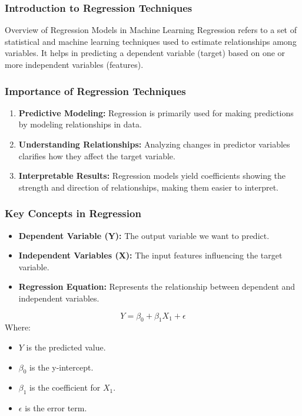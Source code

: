 \documentclass[aspectratio=169]{beamer}
\begin{document}
\frame{\titlepage}

\begin{frame}[fragile]
    \frametitle{Introduction to Regression Techniques}
    \begin{block}{Overview of Regression Models in Machine Learning}
        Regression refers to a set of statistical and machine learning techniques used to estimate relationships among variables. It helps in predicting a dependent variable (target) based on one or more independent variables (features).
    \end{block}
\end{frame}

\begin{frame}[fragile]
    \frametitle{Importance of Regression Techniques}
    \begin{enumerate}
        \item \textbf{Predictive Modeling:}  
        Regression is primarily used for making predictions by modeling relationships in data.
        
        \item \textbf{Understanding Relationships:}  
        Analyzing changes in predictor variables clarifies how they affect the target variable.
        
        \item \textbf{Interpretable Results:}  
        Regression models yield coefficients showing the strength and direction of relationships, making them easier to interpret.
    \end{enumerate}
\end{frame}

\begin{frame}[fragile]
    \frametitle{Key Concepts in Regression}
    \begin{itemize}
        \item \textbf{Dependent Variable (Y):} The output variable we want to predict.
        \item \textbf{Independent Variables (X):} The input features influencing the target variable.
        \item \textbf{Regression Equation:} Represents the relationship between dependent and independent variables.
    \end{itemize}
    
    \begin{equation}
        Y = \beta_0 + \beta_1 X_1 + \epsilon
    \end{equation}
    Where:
    \begin{itemize}
        \item \( Y \) is the predicted value.
        \item \( \beta_0 \) is the y-intercept.
        \item \( \beta_1 \) is the coefficient for \( X_1 \).
        \item \( \epsilon \) is the error term.
    \end{itemize}
\end{frame}
\end{document}
